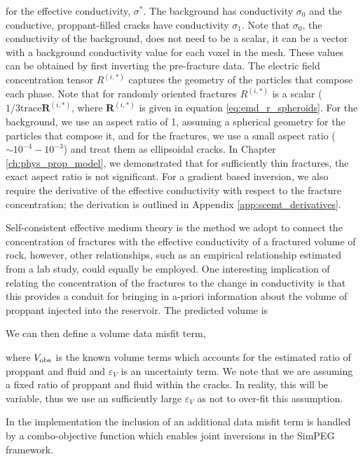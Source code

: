 
for the effective conductivity, $\sigma^*$. The background has conductivity $\sigma_0$ and the conductive, proppant-filled cracks have conductivity $\sigma_1$. Note that $\sigma_0$, the conductivity of the background, does not need to be a scalar, it can be a vector with a background conductivity value for each voxel in the mesh. These values can be obtained by first inverting the pre-fracture data. The electric field concentration tensor $R^{(i,*)}$ captures the geometry of the particles that compose each phase. Note that for randomly oriented fractures $R^{(i,*)}$ is a scalar ($1/3 \text{trace}{\mathbf{R}^{(i,*)}}$, where $\mathbf{R}^{(i,*)}$ is given in equation \ref{eq:emd_r_spheroids}. For the background, we use an aspect ratio of 1, assuming a spherical geometry for the particles that compose it, and for the fractures, we use a small aspect ratio ($\sim 10^{-4} - 10^{-3}$) and treat them as ellipsoidal cracks. In Chapter \ref{ch:phys_prop_model}, we demonstrated that for sufficiently thin fractures, the exact aspect ratio is not significant. For a gradient based inversion, we also require the derivative of the effective conductivity with respect to the fracture concentration; the derivation is outlined in Appendix \ref{app:scemt_derivatives}.

Self-consistent effective medium theory is the method we adopt to connect the concentration of fractures with the effective conductivity of a fractured volume of rock, however, other relationships, such as an empirical relationship estimated from a lab study, could equally be employed. One interesting implication of relating the concentration of the fractures to the change in conductivity is that this provides a conduit for bringing in a-priori information about the volume of proppant injected into the reservoir. The predicted volume is


We can then define a volume data misfit term,


where $V_{\rm obs}$ is the known volume terms which accounts for the estimated ratio of proppant and fluid and $\varepsilon_V$ is an uncertainty term. We note that we are assuming a fixed ratio of proppant and fluid within the cracks. In reality, this will be variable, thus we use an sufficiently large $\varepsilon_V$ as not to over-fit this assumption.

In the implementation the inclusion of an additional data misfit term is handled by a combo-objective function which enables joint inversions in the SimPEG framework.

